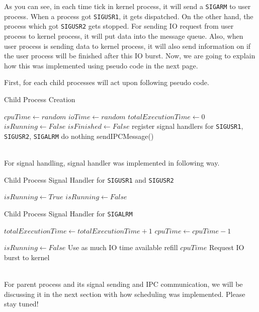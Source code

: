 \documentclass{homework}
\begin{document}
As you can see, in each time tick in kernel process, it will send a \texttt{SIGARM} to user process. When a process got \texttt{SIGUSR1}, it gets dispatched. On the other hand, the process which got \texttt{SIGUSR2} gets stopped. For sending IO request from user process to kernel process, it will put data into the message queue. Also, when user process is sending data to kernel process, it will also send information on if the user process will be finished after this IO burst. 
Now, we are going to explain how this was implemented using pseudo code in the next page.
\pagebreak

First, for each child processes will act upon following pseudo code.
\begin{algorithm}
\caption{Child Process Creation}\label{alg:cap}
\begin{algorithmic}
\State $cpuTime \gets random$
\State $ioTime \gets random$
\State $totalExecutionTime \gets 0$
\State $isRunning \gets False$
\State $isFinished \gets False$
\State register signal handlers for \texttt{SIGUSR1}, \texttt{SIGUSR2}, \texttt{SIGALRM}
    \State do nothing
\EndWhile
\State sendIPCMessage() 
\end{algorithmic}
\end{algorithm}
\\
For signal handling, signal handler was implemented in following way.

\begin{algorithm}
\caption{Child Process Signal Handler for \texttt{SIGUSR1} and \texttt{SIGUSR2}}\label{alg:cap}
\begin{algorithmic}
    \State $isRunning \gets True$ 
    \State $isRunning \gets False$ 
\EndIf
\end{algorithmic}
\end{algorithm}

\begin{algorithm}
\caption{Child Process Signal Handler for \texttt{SIGALRM}}\label{alg:cap}
\begin{algorithmic}
\State $totalExecutionTime \gets totalExecutionTime + 1$
 
    \State $cpuTime \gets cpuTime - 1$
\EndIf

 
    \State $isRunning \gets False$
        \State Use as much IO time available
    \Else
        \State refill $cpuTime$
    \EndIf
    \State Request IO burst to kernel
\EndIf
\end{algorithmic}
\end{algorithm}
\\
For parent process and its signal sending and IPC communication, we will be discussing it in the next section with how scheduling was implemented. Please stay tuned!
\pagebreak
\end{document}
